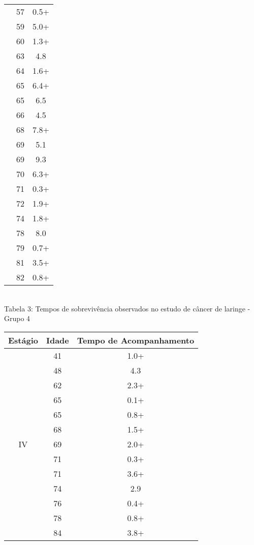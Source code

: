 \documentclass[12pt,a4paper]{article}
\begin{document}
\begin{center}
\begin{tabular}{|c|c|c|}
			& 57 & 0.5+\\ \cline{2-3}
			& 59 & 5.0+\\ \cline{2-3}
			& 60 & 1.3+\\ \cline{2-3}
			& 63 & 4.8\\ \cline{2-3}
			& 64 & 1.6+\\ \cline{2-3}
			& 65 & 6.4+\\ \cline{2-3}
			& 65 & 6.5\\ \cline{2-3}
			& 66 & 4.5\\ \cline{2-3}
			& 68 & 7.8+\\ \cline{2-3}
			& 69 & 5.1\\ \cline{2-3}
			& 69 & 9.3\\ \cline{2-3}
			& 70 & 6.3+\\ \cline{2-3}
			& 71 & 0.3+\\ \cline{2-3}
			& 72 & 1.9+\\ \cline{2-3}
			& 74 & 1.8+\\ \cline{2-3}
			& 78 & 8.0\\ \cline{2-3}
			& 79 & 0.7+\\ \cline{2-3}
			& 81 & 3.5+\\ \cline{2-3}
			& 82 & 0.8+\\ \hline			
		\end{tabular}
		\vspace{1cm}\\
		\small{Tabela 3: Tempos de sobrevivência observados no estudo de câncer de laringe  - Grupo 4}
		\begin{tabular}{|c|c|c|}\hline
			\textbf{Estágio} & \textbf{Idade} & \textbf{Tempo de Acompanhamento}\\ \hline
			\multirow{13}{*}{IV} & 41 & 1.0+\\ \cline{2-3}
			& 48 & 4.3\\ \cline{2-3}
			& 62 & 2.3+\\ \cline{2-3}
			& 65 & 0.1+\\ \cline{2-3}
			& 65 & 0.8+\\ \cline{2-3}
			& 68 & 1.5+\\ \cline{2-3}
			& 69 & 2.0+\\ \cline{2-3}
			& 71 & 0.3+\\ \cline{2-3}
			& 71 & 3.6+\\ \cline{2-3}
			& 74 & 2.9\\ \cline{2-3}
			& 76 & 0.4+\\ \cline{2-3}
			& 78 & 0.8+\\ \cline{2-3}
			& 84 & 3.8+\\ \hline
		\end{tabular}
	\end{center}
\end{document}
